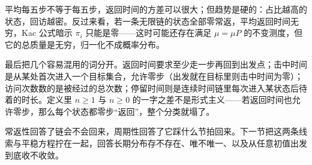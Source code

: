 平均每五步不等于每五步，返回时间的方差可以很大；但趋势是硬的：占比越高的状态，回访越密。反过来看，若一条无限链的状态全部零常返，平均返回时间无穷，Kac 公式暗示 \(\pi_i\) 只能是零——这时可能还存在满足 \(\mu=\mu P\) 的不变测度，但它的总质量是无穷，归一化不成概率分布。

最后把几个容易混用的词分开。返回时间要求至少走一步再回到出发点；击中时间是从某处首次进入一个目标集合，允许零步（出发就在目标里则击中时间为零）；访问次数数的是被经过的总次数；停留时间则是连续时间链里每次进入某状态后待着的时长。定义里 \(n\ge1\) 与 \(n\ge0\) 的一字之差不是形式主义——若返回时间也允许零步，那么每个状态都零步``返回''，整个分类就塌了。

常返性回答了链会不会回来，周期性回答了它踩什么节拍回来。下一节把这两条线索与平稳方程拧在一起，回答长期分布存不存在、唯不唯一、以及从任意初值出发到底收不收敛。
